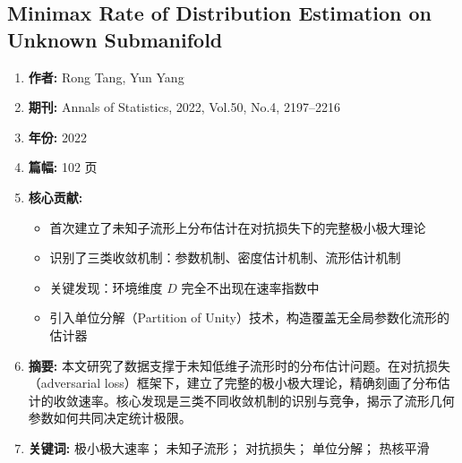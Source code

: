 \subsection{Minimax Rate of Distribution Estimation on Unknown Submanifold}
\begin{enumerate}
    \item \textbf{作者:} Rong Tang, Yun Yang
    \item \textbf{期刊:} Annals of Statistics, 2022, Vol.50, No.4, 2197--2216
    \item \textbf{年份:} 2022
    \item \textbf{篇幅:} 102 页
    \item \textbf{核心贡献:}
        \begin{itemize}
            \item 首次建立了未知子流形上分布估计在对抗损失下的完整极小极大理论
            \item 识别了三类收敛机制：参数机制、密度估计机制、流形估计机制
            \item 关键发现：环境维度 $D$ 完全不出现在速率指数中
            \item 引入单位分解（Partition of Unity）技术，构造覆盖无全局参数化流形的估计器
        \end{itemize}
    \item \textbf{摘要:} 本文研究了数据支撑于未知低维子流形时的分布估计问题。在对抗损失（adversarial loss）框架下，建立了完整的极小极大理论，精确刻画了分布估计的收敛速率。核心发现是三类不同收敛机制的识别与竞争，揭示了流形几何参数如何共同决定统计极限。
    \item \textbf{关键词:} 极小极大速率； 未知子流形； 对抗损失； 单位分解； 热核平滑
\end{enumerate}

